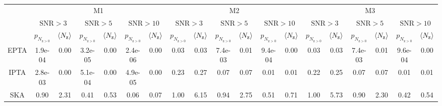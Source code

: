 \begin{table}[h]
\centering
\begin{tabular}{c|cccccc|cccccc|cccccc}
\toprule
  & \multicolumn{6}{c}{M1} & \multicolumn{6}{c}{M2} & \multicolumn{6}{c}{M3} \\
 & \multicolumn{2}{c}{$\mathrm{SNR}>3$} & \multicolumn{2}{c}{$\mathrm{SNR}>5$} & \multicolumn{2}{c}{$\mathrm{SNR}>10$} & \multicolumn{2}{c}{$\mathrm{SNR}>3$} & \multicolumn{2}{c}{$\mathrm{SNR}>5$} & \multicolumn{2}{c}{$\mathrm{SNR}>10$} & \multicolumn{2}{c}{$\mathrm{SNR}>3$} & \multicolumn{2}{c}{$\mathrm{SNR}>5$} & \multicolumn{2}{c}{$\mathrm{SNR}>10$} \\
 & $p_{N_{\mathrm{z} > 0}}$ & $\langle N_{\rm z} \rangle$ & $p_{N_{\mathrm{z} > 0}}$ & $\langle N_{\rm z} \rangle$ & $p_{N_{\mathrm{z} > 0}}$ & $\langle N_{\rm z} \rangle$ & $p_{N_{\mathrm{z} > 0}}$ & $\langle N_{\rm z} \rangle$ & $p_{N_{\mathrm{z} > 0}}$ & $\langle N_{\rm z} \rangle$ & $p_{N_{\mathrm{z} > 0}}$ & $\langle N_{\rm z} \rangle$ & $p_{N_{\mathrm{z} > 0}}$ & $\langle N_{\rm z} \rangle$ & $p_{N_{\mathrm{z} > 0}}$ & $\langle N_{\rm z} \rangle$ & $p_{N_{\mathrm{z} > 0}}$ & $\langle N_{\rm z} \rangle$ \\
\midrule
EPTA & 1.9e-04 & 0.00 & 3.2e-05 & 0.00 & 2.4e-06 & 0.00 & 0.03 & 0.03 & 7.4e-03 & 0.01 & 9.4e-04 & 0.00 & 0.03 & 0.03 & 7.4e-03 & 0.01 & 9.6e-04 & 0.00 \\
IPTA & 2.8e-03 & 0.00 & 5.1e-04 & 0.00 & 4.9e-05 & 0.00 & 0.23 & 0.27 & 0.07 & 0.07 & 0.01 & 0.01 & 0.22 & 0.25 & 0.07 & 0.07 & 0.01 & 0.01 \\
SKA & 0.90 & 2.31 & 0.41 & 0.53 & 0.06 & 0.07 & 1.00 & 6.15 & 0.94 & 2.75 & 0.51 & 0.71 & 1.00 & 5.73 & 0.90 & 2.30 & 0.42 & 0.54 \\
\bottomrule
\end{tabular}
\end{table}